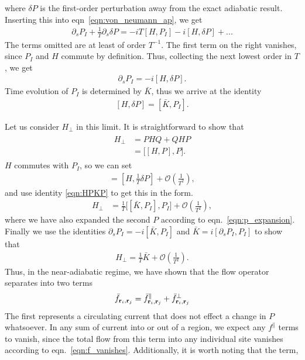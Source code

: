 where $\delta P$ is the first-order perturbation away from the exact adiabatic result. Inserting this into eqn~\ref{eqn:von_neumann_ap}, we get
\begin{align}
    \partial_s P_I + \frac{1}{T} \partial_{s}\delta P = -iT [H, P_I] -i [H, \delta P] + ...
\end{align}
The terms omitted are at least of order $T^{-1}$. The first term on the right vanishes, since $P_I$ and $H$ commute by definition. Thus, collecting the next lowest order in $T$, we get
\begin{align}
    \partial_s P_I = -i [H, \delta P].
\end{align}
Time evolution of $P_I$ is determined by $\bar K$, thus we arrive at the identity
\begin{align} \label{eqn:HPKP}
    [H, \delta P] = [\bar K, P_I].
\end{align}\par
Let us consider $H_\perp$ in this limit. It is straightforward to show that
\begin{align}
\begin{aligned}
    H_{\perp} &= PHQ+QHP \\ 
    &= \big[ [H,P] , P  \big].
\end{aligned}
\end{align}
$H$ commutes with $P_I$, so we can set  
\begin{align}
    [H,P] =[H, \frac{1}{T} \delta P]+ 
    \mathcal{O} \left (\frac{1}{T^2} \right ),
\end{align}
and use identity \ref{eqn:HPKP} to get this in the form.
\begin{align}
    H_{\perp} &= \frac{1}{T}  \big[ [\bar K, P_I] , P_I  \big] + 
    \mathcal{O} \left (\frac{1}{T^2} \right ), 
\end{align}
where we have also expanded the second $P$ according to eqn.~\ref{eqn:p_expansion}. Finally we use the identities $\partial_s P_I = -i [\bar K, P_I]$ and $\bar  K = i[\partial_s P_I, P_I]$ to show that
\begin{align}
    H_{\perp} = \frac{1}{T} \bar K + \mathcal{O} \left (\frac{1}{T^2} \right ).
\end{align}
Thus, in the near-adiabatic regime, we have shown that the flow operator separates into two terms
\begin{align}
    \bar f_{\textbf r_i,\textbf r_j} = \bar f^\parallel_{\textbf r_i,\textbf r_j} + \bar f^\perp_{\textbf r_i,\textbf r_j}
\end{align}
The first represents a circulating current that does not effect a change in $P$ whatsoever. In any sum of current into or out of a region, we expect any $f^\parallel$ terms to vanish, since the total flow from this term into any individual site vanishes according to eqn.~\ref{eqn:f_vanishes}. Additionally, it is worth noting that the term,
